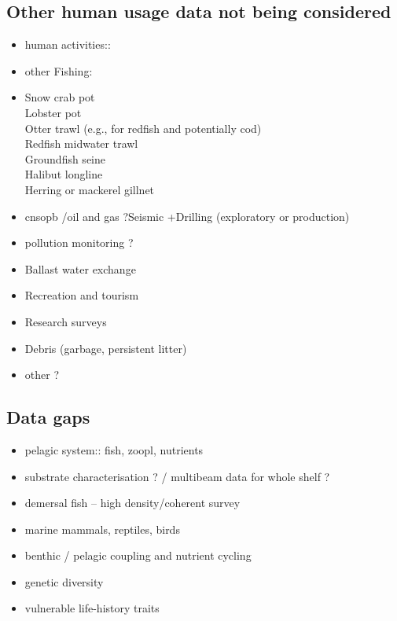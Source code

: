 \documentclass[letterpaper,portrait,11pt]{scrartcl}
\numberwithin{equation}{section}		%
\numberwithin{figure}{section}			%
\numberwithin{table}{section}				%
\begin{document}
\begin{itemize*}
\subsection{Other human usage data not being considered}
\begin{itemize}
  \item human activities::
  \item other Fishing: 
  \item Snow crab pot\\Lobster pot\\Otter trawl (e.g., for redfish and potentially cod)\\Redfish midwater trawl\\Groundfish seine\\Halibut longline\\Herring or mackerel gillnet 
  \item cnsopb /oil and gas ?Seismic +Drilling (exploratory or production) 
  \item pollution monitoring ?
  \item Ballast water exchange 
  \item Recreation and tourism
  \item Research surveys
  \item Debris (garbage, persistent litter) 
  \item other ?
\end{itemize}	
  
\subsection{Data gaps}
\begin{itemize}
  \item pelagic system:: fish, zoopl, nutrients 
  \item substrate characterisation ?  / multibeam data for whole shelf ?
  \item demersal fish -- high density/coherent survey
  \item marine mammals, reptiles, birds
  \item benthic / pelagic coupling and nutrient cycling
  \item genetic diversity 
  \item vulnerable life-history traits
  
\end{itemize}	


\end{itemize*}
\end{document}
